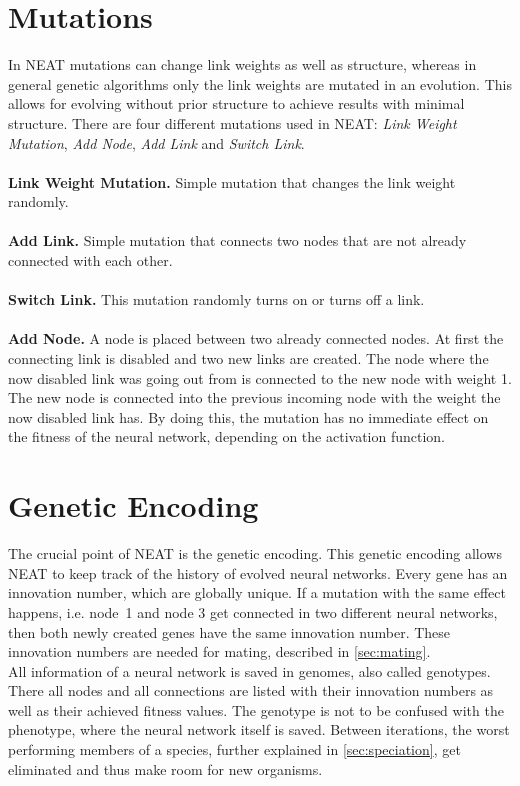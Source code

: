 \section{Mutations}\label{sec:mutation}
In NEAT \cite{neat} mutations can change link weights as well as structure, whereas in general genetic algorithms only the link weights are mutated in an evolution. This allows for evolving without prior structure to achieve results with minimal structure.
 There are four different mutations used in NEAT:  \emph{Link Weight Mutation},  \emph{Add Node},  \emph{Add Link} and  \emph{Switch Link}. \\\\
\textbf{Link Weight Mutation.} Simple mutation that changes the link weight randomly. \\\\
\textbf{Add Link.} Simple mutation that connects two nodes that are not already connected with each other. \\\\
\textbf{Switch Link.} This mutation randomly turns on or turns off a link. \\\\
\textbf{Add Node.} A node is placed between two already connected nodes. At first the connecting link is disabled and two new links are created. The node where the now disabled link was going out from is connected to the new node with weight 1. The new node is connected into the previous incoming node with the weight the now disabled link has. By doing this, the mutation has no immediate effect on the fitness of the neural network, depending on the activation function.

\section{Genetic Encoding}\label{sec:genenc}
The crucial point of NEAT is the genetic encoding. This genetic encoding allows NEAT to keep track of the history of evolved neural networks. Every gene has an innovation number, which are globally unique. If a mutation with the same effect happens, i.e. node~1 and node 3 get connected in two different neural networks, then both newly created genes have the same innovation number. These innovation numbers are needed for mating, described in \autoref{sec:mating}. \\
All information of a neural network is saved in genomes, also called genotypes. There all nodes and all connections are listed with their innovation numbers as well as their achieved fitness values. The genotype is not to be confused with the phenotype, where the neural network itself is saved. Between iterations, the worst performing members of a species, further explained in \autoref{sec:speciation}, get eliminated and thus make room for new organisms. 

